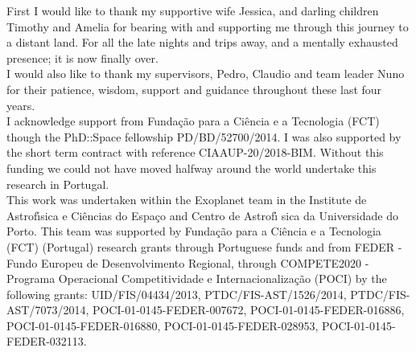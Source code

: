 
\begin{acknowledgements}
First I would like to thank my supportive wife Jessica, and darling children Timothy and Amelia for bearing with and supporting me through this journey to a distant land.
For all the late nights and trips away, and a mentally exhausted presence; it is now finally over.\\

I would also like to thank my supervisors, Pedro, Claudio and team leader Nuno for their patience, wisdom, support and guidance throughout these last four years.\\

I acknowledge support from Funda\c{c}\~{a}o para a Ci\^encia e a Tecnologia (FCT) though the PhD::Space fellowship PD/BD/52700/2014.
I was also supported by the short term contract with reference CIAAUP-20/2018-BIM.
Without this funding we could not have moved halfway around the world undertake this research in Portugal.\\

This work was undertaken within the Exoplanet team in the Institute de Astrof\'{\i}sica e Ci\^encias do Espa\c{c}o and Centro de Astrof\'{\i} sica da Universidade do Porto.
This team was supported by Funda\c{c}\~ao para a Ci\^{e}ncia e a Tecnologia (FCT) (Portugal) research grants through Portuguese funds and from FEDER - Fundo Europeu de Desenvolvimento Regional, through COMPETE2020 - Programa Operacional Competitividade e Internacionaliza\c{c}\~{a}o (POCI) by the following grants:
UID/FIS/04434/2013,
PTDC/FIS-AST/1526/2014,
PTDC/FIS-AST/7073/2014,
POCI-01-0145-FEDER-007672,
POCI-01-0145-FEDER-016886,
POCI-01-0145-FEDER-016880,
POCI-01-0145-FEDER-028953,
POCI-01-0145-FEDER-032113.

\end{acknowledgements}
